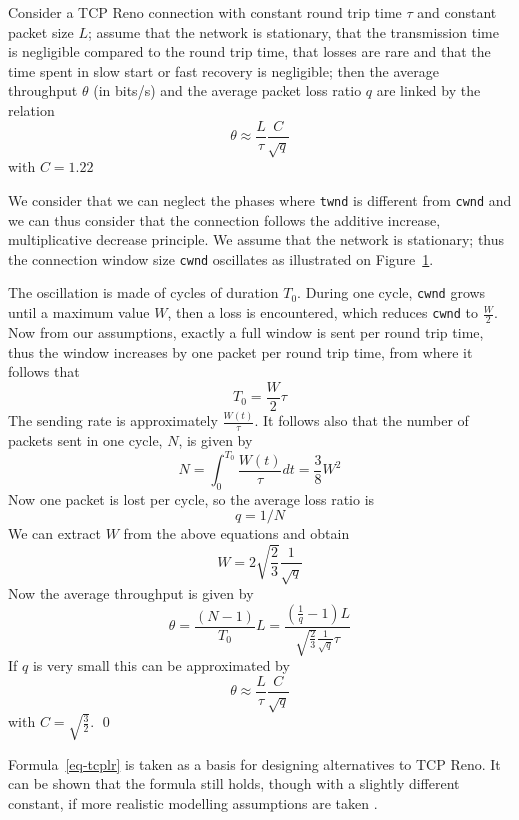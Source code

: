 \begin{theorem}
Consider a TCP Reno connection with constant round trip time $\tau$ and
constant packet size $L$; assume that the network is stationary,
that the transmission time is negligible compared to the round trip
time, that losses are rare and that the time spent in slow start or fast
recovery is negligible; then the average throughput $\theta$ (in
bits/s) and the average packet loss ratio $q$ are linked by the
relation
\begin{equation}
        \theta \approx \frac{L}{\tau} \frac{C}{\sqrt{q}}
        \label{eq-tcplr}
\end{equation}
with $C = 1.22$
\label{theo-lf}
\end{theorem}

\pr We consider that we can neglect the phases where \texttt{twnd} is
different from \texttt{cwnd} and we can thus consider that the
connection follows the additive increase, multiplicative decrease
principle.  We assume that the network is stationary; thus the
connection window size \texttt{cwnd} oscillates as illustrated on
Figure~\ref{d32f8}.
\begin{figure}[h]
        \protect\label{d32f8}
\end{figure}
The oscillation is made of cycles of duration $T_{0}$. During one
cycle, \texttt{cwnd} grows until a maximum value $W$, then a loss is
encountered, which reduces \texttt{cwnd} to $\frac{W}{2}$. Now from
our assumptions, exactly a full window is sent per round trip time,
thus the window increases by one packet per round trip time, from
where it follows that
$$
T_{0} = \frac{W}{2} \tau
$$
The sending rate is approximately $\frac{W(t)}{\tau}$. It follows also
that the number of packets sent in one cycle, $N$, is given by
$$
N = \int_{0}^{T_{0}} \frac{W(t)}{\tau} dt = \frac{3}{8} W^2
$$
Now one packet is lost per cycle, so the average loss ratio is
$$
q = 1 / N
$$
We can extract $W$ from the above equations and obtain
$$
W = 2 \sqrt{\frac{2}{3}} \frac{1}{\sqrt{q}}
$$
Now the average throughput is given by
$$
\theta =  \frac{(N - 1) }{ T_{0}} L =
\frac{\left ( \frac{1}{q} -1 \right ) L
}{
\sqrt{\frac{2}{3}} \frac{1}{\sqrt{q}} \tau }
$$
If $q$ is very small this can be approximated by
$$
\theta \approx \frac{L}{\tau} \frac{C }{\sqrt{q}}
$$
with $C=\sqrt{\frac{3}{2}}$.
\qed

Formula~\ref{eq-tcplr} is taken as a basis for designing alternatives to TCP Reno. It can be shown that the formula still holds, though
with a slightly different constant, if more realistic modelling
assumptions are taken \cite{Flo91, Lak97}.



